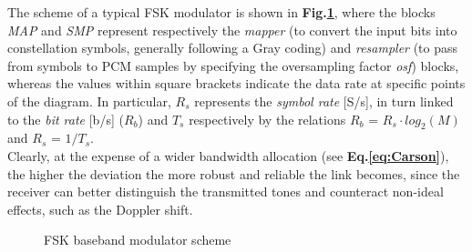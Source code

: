 \documentclass[twoside,twocolumn]{article}
\begin{document}
The scheme of a typical FSK modulator is shown in \textbf{Fig.\ref{fig:FSK}}, where the blocks \textit{MAP} and \textit{SMP} represent respectively the \textit{mapper} (to convert the input bits into constellation symbols, generally following a Gray coding) and \textit{resampler} (to pass from symbols to PCM samples by specifying the oversampling factor \textit{osf}) blocks, whereas the values within square brackets indicate the data rate at specific points of the diagram. In particular, $R_s$ represents the \textit{symbol rate} [S/s], in turn linked to the \textit{bit rate} [b/s] ($R_b$) and $T_s$ respectively by the relations $R_b$ = $R_s \cdot log_2(M)$ and $R_s$ = $1/T_s$.\\
Clearly, at the expense of a wider bandwidth allocation (see \textbf{Eq.\ref{eq:Carson}}), the higher the deviation the more robust and reliable the link becomes, since the receiver can better distinguish the transmitted tones and counteract non-ideal effects, such as the Doppler shift.

\begin{figure}[h!]
\centering
{}
    \caption{FSK baseband modulator scheme} \label{fig:FSK}
\end{figure}
\end{document}
